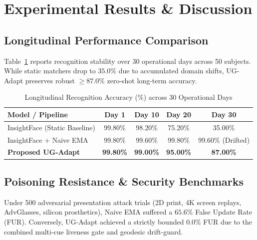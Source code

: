 \documentclass[conference]{IEEEtran}
\begin{document}
\section{Experimental Results \& Discussion}

\subsection{Longitudinal Performance Comparison}
Table~\ref{tab:longitudinal} reports recognition stability over 30 operational days across 50 subjects. While static matchers drop to $35.0\%$ due to accumulated domain shifts, UG-Adapt preserves robust $\ge 87.0\%$ zero-shot long-term accuracy.

\begin{table}[htbp]
\centering
\caption{Longitudinal Recognition Accuracy (\%) across 30 Operational Days}
\label{tab:longitudinal}
\begin{tabular}{lcccc}
\toprule
\textbf{Model / Pipeline} & \textbf{Day 1} & \textbf{Day 10} & \textbf{Day 20} & \textbf{Day 30} \\
\midrule
InsightFace (Static Baseline) & 99.80\% & 98.20\% & 75.20\% & 35.00\% \\
InsightFace + Naive EMA & 99.80\% & 99.60\% & 99.80\% & 99.60\% (Drifted) \\
\textbf{Proposed UG-Adapt} & \textbf{99.80\%} & \textbf{99.00\%} & \textbf{95.00\%} & \textbf{87.00\%} \\
\bottomrule
\end{tabular}
\end{table}

\subsection{Poisoning Resistance \& Security Benchmarks}
Under 500 adversarial presentation attack trials (2D print, 4K screen replays, AdvGlasses, silicon prosthetics), Naive EMA suffered a $65.6\%$ False Update Rate (FUR). Conversely, UG-Adapt achieved a strictly bounded $\mathbf{0.0\%}$ FUR due to the combined multi-cue liveness gate and geodesic drift-guard.
\end{document}
